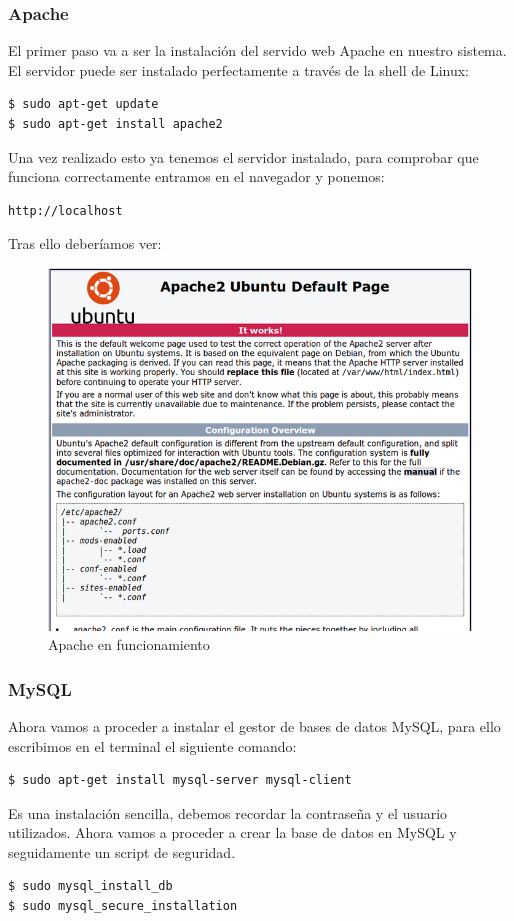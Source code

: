 \subsubsection{Apache}
El primer paso va a ser la instalación del servido web Apache en nuestro sistema. El servidor puede ser instalado perfectamente a través de la shell de Linux:
\begin{lstlisting}[language=bash,keywordstyle=\color{black}]
$ sudo apt-get update
$ sudo apt-get install apache2
\end{lstlisting}
Una vez realizado esto ya tenemos el servidor instalado, para comprobar que funciona correctamente entramos en el navegador y ponemos: 
\begin{lstlisting}[language=bash,keywordstyle=\color{black}]
http://localhost
\end{lstlisting}
Tras ello deberíamos ver:
\begin{figure}
\centering
\includegraphics[width=.9\textwidth]{img/apache}
\caption{Apache en funcionamiento}
\label{fig:Apache}
\end{figure}

\subsubsection{MySQL}
Ahora vamos a proceder a instalar el gestor de bases de datos MySQL, para ello   escribimos en el terminal el siguiente comando:
\begin{lstlisting}[language=bash,keywordstyle=\color{black}]
$ sudo apt-get install mysql-server mysql-client
\end{lstlisting}
Es una instalación sencilla, debemos recordar la contraseña y el usuario utilizados.
Ahora vamos a proceder a crear la base de datos en MySQL y  seguidamente un script de seguridad.
\begin{lstlisting}[language=bash,keywordstyle=\color{black}]
$ sudo mysql_install_db
$ sudo mysql_secure_installation
\end{lstlisting}
